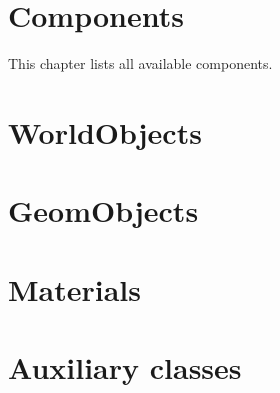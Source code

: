 \documentclass{manual}
\begin{document}



\chapter{Components \label{components}}


This chapter lists all available components.
















\chapter{WorldObjects \label{worldobjects}}


























\chapter{GeomObjects \label{geomobjects}}











\chapter{Materials \label{materials}}






\chapter{Auxiliary classes \label{auxclasses}}
\end{document}
